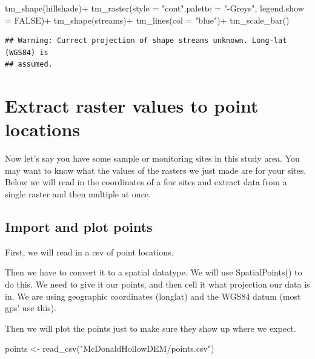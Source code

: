 \documentclass[
]{book}
\newenvironment{Shaded}{\begin{snugshade}}{\end{snugshade}}
\newcommand{\AttributeTok}[1]{\textcolor[rgb]{0.77,0.63,0.00}{#1}}
\newcommand{\ConstantTok}[1]{\textcolor[rgb]{0.00,0.00,0.00}{#1}}
\newcommand{\FunctionTok}[1]{\textcolor[rgb]{0.00,0.00,0.00}{#1}}
\newcommand{\NormalTok}[1]{#1}
\newcommand{\OtherTok}[1]{\textcolor[rgb]{0.56,0.35,0.01}{#1}}
\newcommand{\SpecialCharTok}[1]{\textcolor[rgb]{0.00,0.00,0.00}{#1}}
\newcommand{\StringTok}[1]{\textcolor[rgb]{0.31,0.60,0.02}{#1}}
\begin{document}
\begin{Shaded}
\begin{Highlighting}[]
\FunctionTok{tm\_shape}\NormalTok{(hillshade)}\SpecialCharTok{+}
  \FunctionTok{tm\_raster}\NormalTok{(}\AttributeTok{style =} \StringTok{"cont"}\NormalTok{,}\AttributeTok{palette =} \StringTok{"{-}Greys"}\NormalTok{, }\AttributeTok{legend.show =} \ConstantTok{FALSE}\NormalTok{)}\SpecialCharTok{+}
\FunctionTok{tm\_shape}\NormalTok{(streams)}\SpecialCharTok{+}
  \FunctionTok{tm\_lines}\NormalTok{(}\AttributeTok{col =} \StringTok{"blue"}\NormalTok{)}\SpecialCharTok{+}
  \FunctionTok{tm\_scale\_bar}\NormalTok{()}
\end{Highlighting}
\end{Shaded}

\begin{verbatim}
## Warning: Currect projection of shape streams unknown. Long-lat (WGS84) is
## assumed.
\end{verbatim}

\hypertarget{extract-raster-values-to-point-locations}{%
\section{Extract raster values to point locations}\label{extract-raster-values-to-point-locations}}

Now let's say you have some sample or monitoring sites in this study area. You may want to know what the values of the rasters we just made are for your sites. Below we will read in the coordinates of a few sites and extract data from a single raster and then multiple at once.

\hypertarget{import-and-plot-points}{%
\subsection{Import and plot points}\label{import-and-plot-points}}

First, we will read in a csv of point locations.

Then we have to convert it to a spatial datatype. We will use SpatialPoints() to do this. We need to give it our points, and then cell it what projection our data is in. We are using geographic coordinates (longlat) and the WGS84 datum (most gps' use this).

Then we will plot the points just to make sure they show up where we expect.

\begin{Shaded}
\begin{Highlighting}[]
\NormalTok{points }\OtherTok{\textless{}{-}} \FunctionTok{read\_csv}\NormalTok{(}\StringTok{"McDonaldHollowDEM/points.csv"}\NormalTok{)}
\end{Highlighting}
\end{Shaded}
\end{document}
